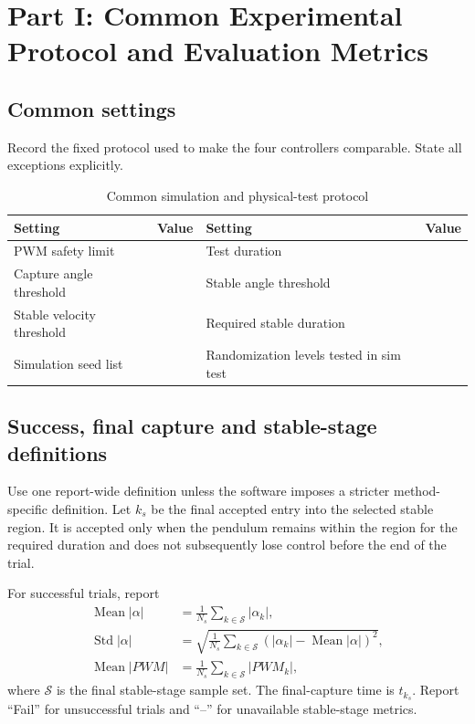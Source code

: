 \documentclass[11pt,a4paper]{article}
\begin{document}
\section{Part I: Common Experimental Protocol and Evaluation Metrics}
\label{sec:common}

\subsection{Common settings}

Record the fixed protocol used to make the four controllers comparable. State
all exceptions explicitly.

\begin{table}[H]
\centering
\caption{Common simulation and physical-test protocol}
\label{tab:commonsettings}
\small
\begin{tabular}{ll@{\qquad}ll}
\toprule
Setting & Value & Setting & Value\\
\midrule

PWM safety limit & &Test duration & \\
Capture angle threshold & & Stable angle threshold & \\
Stable velocity threshold & & Required stable duration & \\
Simulation seed list & & Randomization levels tested in sim test & \\
\bottomrule
\end{tabular}
\end{table}





\subsection{Success, final capture and stable-stage definitions}

Use one report-wide definition unless the software imposes a stricter method-
specific definition. Let $k_s$ be the final accepted entry into the selected
stable region. It is accepted only when the pendulum remains within the region
for the required duration and does not subsequently lose control before the end
of the trial.

For successful trials, report
\begin{align}
\operatorname{Mean}|\alpha|
&=\frac{1}{N_s}\sum_{k\in\mathcal S}|\alpha_k|,\\
\operatorname{Std}|\alpha|
&=\sqrt{\frac{1}{N_s}\sum_{k\in\mathcal S}
\left(|\alpha_k|-\operatorname{Mean}|\alpha|\right)^2},\\
\operatorname{Mean}|PWM|
&=\frac{1}{N_s}\sum_{k\in\mathcal S}|PWM_k|,
\end{align}
where $\mathcal S$ is the final stable-stage sample set. The final-capture time
is $t_{k_s}$. Report ``Fail'' for unsuccessful trials and ``--'' for unavailable
stable-stage metrics.
\end{document}
